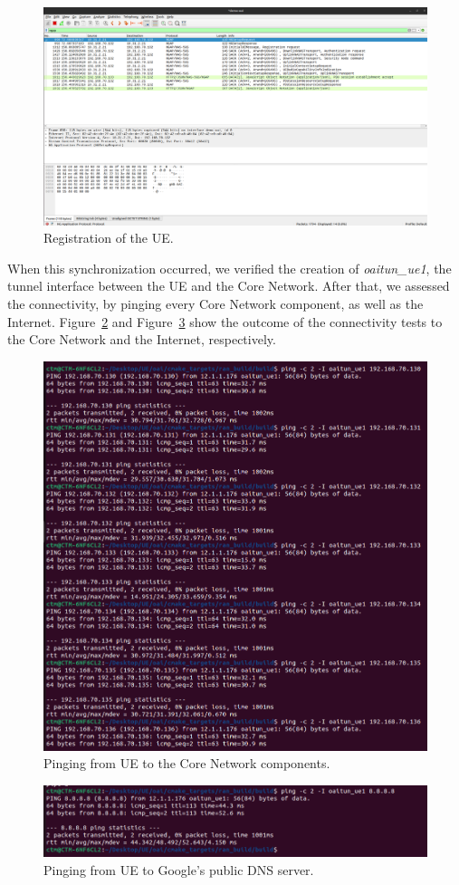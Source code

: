 \begin{figure}[H]
    \centering
    \includegraphics[width=0.8\linewidth]{figures/ue_registration}
    \caption{Registration of the UE.}
    \label{fig:registration_ue}
\end{figure}

When this synchronization occurred, we verified the creation of \textit{oaitun\_ue1}, the tunnel interface between the UE and the Core Network.
After that, we assessed the connectivity, by pinging every Core Network component, as well as the Internet.
Figure~\ref{fig:ping_ue_core} and Figure~\ref{fig:ping_ue_internet} show the outcome of the connectivity tests to the Core Network and the Internet, respectively.

\begin{figure}[H]
    \centering
    \includegraphics[width=0.5\linewidth]{figures/ue_core_ping}
    \caption{Pinging from UE to the Core Network components.}
    \label{fig:ping_ue_core}
\end{figure}

\begin{figure}[H]
    \centering
    \includegraphics[width=0.5\linewidth]{figures/ue_to_ext}
    \caption{Pinging from UE to Google's public DNS server.}
    \label{fig:ping_ue_internet}
\end{figure}


